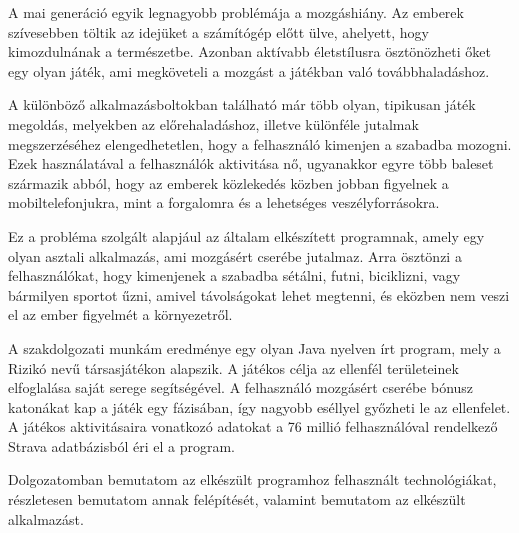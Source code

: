 A mai generáció egyik legnagyobb problémája a mozgáshiány.
Az emberek szívesebben töltik az idejüket a számítógép előtt ülve, ahelyett, hogy kimozdulnának a természetbe.
Azonban aktívabb életstílusra ösztönözheti őket egy olyan játék, ami megköveteli a mozgást a játékban való továbbhaladáshoz. 

A különböző alkalmazásboltokban található már több olyan, tipikusan játék megoldás, melyekben az előrehaladáshoz, illetve különféle jutalmak megszerzéséhez elengedhetetlen, hogy a felhasználó kimenjen a szabadba mozogni.
Ezek használatával a felhasználók aktivitása nő, ugyanakkor egyre több baleset származik abból, hogy az emberek közlekedés közben jobban figyelnek a mobiltelefonjukra, mint a forgalomra és a lehetséges veszélyforrásokra. 

Ez a probléma szolgált alapjául az általam elkészített programnak, amely egy olyan asztali alkalmazás, ami mozgásért cserébe jutalmaz.
Arra ösztönzi a felhasználókat, hogy kimenjenek a szabadba sétálni, futni, biciklizni, vagy bármilyen sportot űzni, amivel távolságokat lehet megtenni, és eközben nem veszi el az ember figyelmét a környezetről. 

A szakdolgozati munkám eredménye egy olyan Java nyelven írt program, mely a Rizikó nevű társasjátékon alapszik.
A játékos célja az ellenfél területeinek elfoglalása saját serege segítségével.
A felhasználó mozgásért cserébe bónusz katonákat kap a játék egy fázisában, így nagyobb eséllyel győzheti le az ellenfelet.
A játékos aktivitásaira vonatkozó adatokat a 76 millió felhasználóval rendelkező Strava adatbázisból éri el a program. 

Dolgozatomban bemutatom az elkészült programhoz felhasznált technológiákat, részletesen bemutatom annak felépítését, valamint bemutatom az elkészült alkalmazást. 
